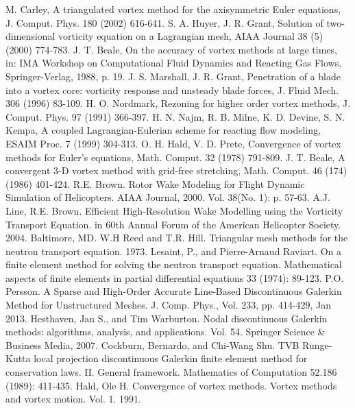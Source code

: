 \documentclass[letterpaper,12pt]{report}
\begin{document}
\begin{thebibliography}{8}
M. Carley, A triangulated vortex method for the axisymmetric Euler equations, J. Comput. Phys. 180 (2002) 616-641.
S. A. Huyer, J. R. Grant, Solution of two-dimensional vorticity equation on a Lagrangian mesh, AIAA Journal 38 (5) (2000) 774-783.
J. T. Beale, On the accuracy of vortex methods at large times, in: IMA Workshop on Computational Fluid Dynamics and Reacting Gas Flows, Springer-Verlag, 1988, p. 19.
J. S. Marshall, J. R. Grant, Penetration of a blade into a vortex core: vorticity response and unsteady blade forces, J. Fluid Mech. 306 (1996) 83-109.
H. O. Nordmark, Rezoning for higher order vortex methods, J. Comput. Phys. 97 (1991) 366-397.
H. N. Najm, R. B. Milne, K. D. Devine, S. N. Kempa, A coupled Lagrangian-Eulerian scheme for reacting flow modeling, ESAIM Proc. 7 (1999) 304-313.
O. H. Hald, V. D. Prete, Convergence of vortex methods for Euler's equations, Math. Comput. 32 (1978) 791-809.
J. T. Beale, A convergent 3-D vortex method with grid-free stretching, Math. Comput. 46 (174) (1986) 401-424.
 R.E. Brown. Rotor Wake Modeling for Flight Dynamic Simulation of Helicopters. AIAA Journal, 2000. Vol. 38(No. 1): p. 57-63.
A.J. Line, R.E. Brown. Efficient High-Resolution Wake Modelling using the Vorticity Transport Equation. in 60th Annual Forum of the American Helicopter Society. 2004. Baltimore, MD.
W.H Reed and T.R. Hill. Triangular mesh methods for the neutron transport equation. 1973.
Lesaint, P., and Pierre-Arnaud Raviart. On a finite element method for solving the neutron transport equation. Mathematical aspects of finite elements in partial differential equations 33 (1974): 89-123.
P.O. Persson. A Sparse and High-Order Accurate Line-Based Discontinuous Galerkin Method for Unstructured Meshes. J. Comp. Phys., Vol. 233, pp. 414-429, Jan 2013.
Hesthaven, Jan S., and Tim Warburton. Nodal discontinuous Galerkin methods: algorithms, analysis, and applications. Vol. 54. Springer Science \& Business Media, 2007.
Cockburn, Bernardo, and Chi-Wang Shu. TVB Runge-Kutta local projection discontinuous Galerkin finite element method for conservation laws. II. General framework. Mathematics of Computation 52.186 (1989): 411-435.
Hald, Ole H. Convergence of vortex methods. Vortex methods and vortex motion. Vol. 1. 1991.

\end{thebibliography}
\end{document}
